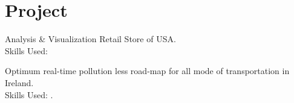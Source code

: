 \documentclass[]{aj-resume-openfont}
\begin{document}
\begin{minipage}[t]{0.66\textwidth}




\section{Project}

Analysis \& Visualization Retail Store of USA.\\
Skills Used: 
\sectionsep

Optimum real-time pollution less road-map for all mode of transportation in Ireland.\\
Skills Used: .
\sectionsep


\end{minipage}
\end{document}
